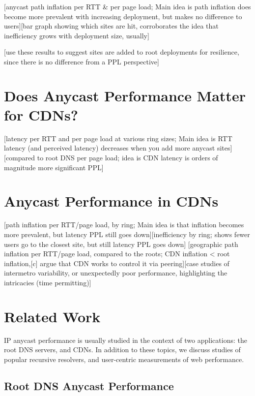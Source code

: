 \documentclass[sigconf,nonacm,10pt]{acmart}
\begin{document}
\label{sec:root_dns_anycast} {[}anycast path inflation per RTT \& per
page load; Main idea is path inflation does become more prevalent with
increasing deployment, but makes no difference to users{]}{[}bar graph
showing which sites are hit, corroborates the idea that inefficiency
grows with deployment size, usually{]}

{[}use these results to suggest sites are added to root deployments for
resilience, since there is no difference from a PPL perspective{]}

\section{Does Anycast Performance Matter for
CDNs?}\label{does-anycast-performance-matter-for-cdns}

\label{sec:does_anycast_matter_cdn} {[}latency per RTT and per page load
at various ring sizes; Main idea is RTT latency (and perceived latency)
decreases when you add more anycast sites{]}{[}compared to root DNS per
page load; idea is CDN latency is orders of magnitude more significant
PPL{]}

\section{Anycast Performance in CDNs}\label{anycast-performance-in-cdns}

\label{sec:cdn_anycast} {[}path inflation per RTT/page load, by ring;
Main idea is that inflation becomes more prevalent, but latency PPL
still goes down{]}{[}inefficiency by ring; shows fewer users go to the
closest site, but still latency PPL goes down{]} {[}geographic path
inflation per RTT/page load, compared to the roots; CDN inflation
\textless{} root inflation,{[}c{]} argue that CDN works to control it
via peering{]}{[}case studies of intermetro variability, or unexpectedly
poor performance, highlighting the intricacies (time permitting){]}

\section{Related Work}\label{related-work-1}

\label{sec:related} IP anycast performance is usually studied in the
context of two applications: the root DNS servers, and CDNs. In addition
to these topics, we discuss studies of popular recursive resolvers, and
user-centric measurements of web performance.

\subsection{Root DNS Anycast
Performance}\label{root-dns-anycast-performance}
\end{document}
